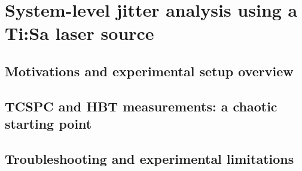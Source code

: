 \chapter{System-level jitter analysis using a Ti:Sa laser source}
\section{Motivations and experimental setup overview}
\section{TCSPC and HBT measurements: a chaotic starting point}
\section{Troubleshooting and experimental limitations}